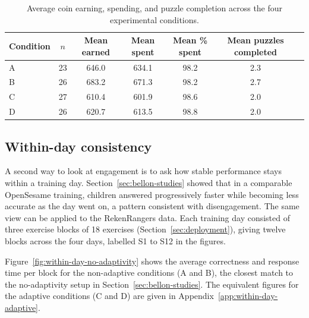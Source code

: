 \begin{table}
\centering
\small
\setlength{\tabcolsep}{6pt}

\begin{tabular}{@{}lcccccc@{}}
\toprule

Condition & \(n\) & Mean earned & Mean spent & Mean \% spent & Mean puzzles completed \\
\midrule
A & 23 & 646.0 & 634.1 & 98.2 & 2.3 \\
B & 26 & 683.2 & 671.3 & 98.2 & 2.7 \\
C & 27 & 610.4 & 601.9 & 98.6 & 2.0 \\
D & 26 & 620.7 & 613.5 & 98.8 & 2.0 \\
\bottomrule
\end{tabular}

\caption{Average coin earning, spending, and puzzle completion across the four experimental conditions.}
\label{tab:coin-summary}
\end{table}


\subsection{Within-day consistency}
\label{sec:within-day-consistency}
A second way to look at engagement is to ask how stable performance stays within a training day. Section~\ref{sec:bellon-studies} showed that in a comparable OpenSesame training, children answered progressively faster while becoming less accurate as the day went on, a pattern consistent with disengagement. The same view can be applied to the RekenRangers data. Each training day consisted of three exercise blocks of 18 exercises (Section~\ref{sec:deployment}), giving twelve blocks across the four days, labelled S1 to S12 in the figures.
 
Figure~\ref{fig:within-day-no-adaptivity} shows the average correctness and response time per block for the non-adaptive conditions (A and B), the closest match to the no-adaptivity setup in Section~\ref{sec:bellon-studies}. The equivalent figures for the adaptive conditions (C and D) are given in Appendix~\ref{app:within-day-adaptive}.
 
